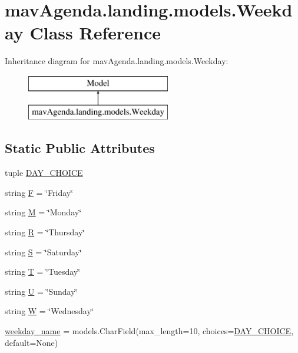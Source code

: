\hypertarget{classmavAgenda_1_1landing_1_1models_1_1Weekday}{}\section{mav\+Agenda.\+landing.\+models.\+Weekday Class Reference}
\label{classmavAgenda_1_1landing_1_1models_1_1Weekday}
Inheritance diagram for mav\+Agenda.\+landing.\+models.\+Weekday\+:\begin{figure}[H]
\begin{center}
\leavevmode
\includegraphics[height=2.000000cm]{classmavAgenda_1_1landing_1_1models_1_1Weekday}
\end{center}
\end{figure}
\subsection*{Static Public Attributes}
\begin{DoxyCompactItemize}
\item 
tuple \mbox{\hyperlink{classmavAgenda_1_1landing_1_1models_1_1Weekday_ad3467f25c1365f72054c0ac79dd457ef}{D\+A\+Y\+\_\+\+C\+H\+O\+I\+CE}}
\item 
string \mbox{\hyperlink{classmavAgenda_1_1landing_1_1models_1_1Weekday_ac86da883fd1945932c224e0d26ecbebd}{F}} = \char`\"{}Friday\char`\"{}
\item 
string \mbox{\hyperlink{classmavAgenda_1_1landing_1_1models_1_1Weekday_a9a4d3f566ccc48e8eb49ba917bf9099e}{M}} = \char`\"{}Monday\char`\"{}
\item 
string \mbox{\hyperlink{classmavAgenda_1_1landing_1_1models_1_1Weekday_a128c98ea60cccdb7af313fa2d3e534c8}{R}} = \char`\"{}Thursday\char`\"{}
\item 
string \mbox{\hyperlink{classmavAgenda_1_1landing_1_1models_1_1Weekday_aadc389409e2d188a812735b37df61380}{S}} = \char`\"{}Saturday\char`\"{}
\item 
string \mbox{\hyperlink{classmavAgenda_1_1landing_1_1models_1_1Weekday_ae633a394e539495db58ee92b3a06937c}{T}} = \char`\"{}Tuesday\char`\"{}
\item 
string \mbox{\hyperlink{classmavAgenda_1_1landing_1_1models_1_1Weekday_af4f6c0bcac6b4c70d189054acfbd3a77}{U}} = \char`\"{}Sunday\char`\"{}
\item 
string \mbox{\hyperlink{classmavAgenda_1_1landing_1_1models_1_1Weekday_a612d40ac711717cd682b5b07418e0aeb}{W}} = \char`\"{}Wednesday\char`\"{}
\item 
\mbox{\hyperlink{classmavAgenda_1_1landing_1_1models_1_1Weekday_a601988941ecd2df730cdc5e124443059}{weekday\+\_\+name}} = models.\+Char\+Field(max\+\_\+length=10, choices=\mbox{\hyperlink{classmavAgenda_1_1landing_1_1models_1_1Weekday_ad3467f25c1365f72054c0ac79dd457ef}{D\+A\+Y\+\_\+\+C\+H\+O\+I\+CE}}, default=None)
\end{DoxyCompactItemize}


